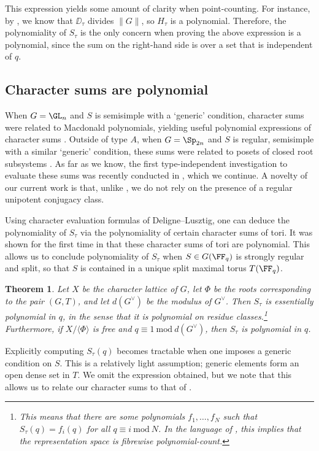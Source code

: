 \documentclass{amsart}
\theoremstyle{plain}
\newtheorem{thm}{Theorem}
\theoremstyle{definition}
\theoremstyle{remark}
\begin{document}
This expression yields some amount of clarity when point-counting. For instance, by \cite[Remark 2.3.27]{GM20}, we know that $\DD_\tau$ divides $\|G\|$, so $H_\tau$ is a polynomial. Therefore, the polynomiality of $S_\tau$ is the only concern when proving the above expression is a polynomial, since the sum on the right-hand side is over a set that is independent of $q$.

\subsection*{Character sums are polynomial}
When $G=\GL_n$ and $S$ is semisimple with a `generic' condition, character sums were related to Macdonald polynomials, yielding useful polynomial expressions of character sums \cite[Theorem 4.3.1]{HLRV11}. Outside of type $A$, when $G=\Sp_{2n}$ and $S$ is regular, semisimple with a similar `generic' condition, these sums were related to posets of closed root subsystems \cite[\S4.3.5]{Cambo17}. As far as we know, the first type-independent investigation to evaluate these sums was recently conducted in \cite{KNP23}, which we continue. A novelty of our current work is that, unlike \cite{KNP23}, we do not rely on the presence of a regular unipotent conjugacy class. 

Using character evaluation formulas of Deligne--Lusztig, one can deduce the polynomiality of $S_\tau$ via the polynomiality of certain character sums of tori. It was shown for the first time in \cite{KNP23} that these character sums of tori are polynomial. This allows us to conclude polynomiality of $S_\tau$ when $S\in G(\FF_q)$ is strongly regular and split, so that $S$ is contained in a unique split maximal torus $T(\FF_q)$. 
\begin{thm}\label{ThmEvalSTau}
Let $X$ be the character lattice of $G$, let $\Phi$ be the roots corresponding to the pair $(G,T)$, and let $d(G^\vee)$ be the modulus of $G^\vee$. Then $S_\tau$ is essentially polynomial in $q$, in the sense that it is polynomial on residue classes.\footnote{This means that there are some polynomials $f_1,\ldots,f_N$ such that $S_\tau(q)=f_i(q)$ for all $q\equiv i\ \mathrm{mod}\ N$. In the language of \cite{HRV08}, this implies that the representation space is fibrewise polynomial-count.} Furthermore, if $X/\langle \Phi\rangle$ is free and $q \equiv 1\ \mathrm{mod}\ d(G^\vee)$, then $S_\tau$ is polynomial in $q$. 
\end{thm}

Explicitly computing $S_\tau(q)$ becomes tractable when one imposes a generic condition on $S$. This is a relatively light assumption; generic elements form an open dense set in $T$. We omit the expression obtained, but we note that this allows us to relate our character sums to that of \cite{HLRV11}. 
\end{document}
